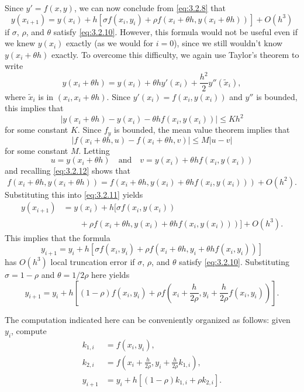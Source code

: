 Since $y'=f(x,y)$, we can now conclude from \eqref{eq:3.2.8} that
\begin{equation} \label{eq:3.2.11}
y(x_{i+1})=y(x_i)+h\left[\sigma f(x_i,y_i)+\rho f(x_i+\theta
h,y(x_i+\theta h))\right]+O(h^3)
\end{equation}
if $\sigma$, $\rho$, and $\theta$ satisfy \eqref{eq:3.2.10}. However,
this formula would not be useful even if we knew $y(x_i)$ exactly (as
we would for $i=0$), since we still wouldn't know $y(x_i+\theta h)$
exactly. To overcome this difficulty, we again use Taylor's theorem to
write
\[
y(x_i+\theta h)=y(x_i)+\theta h y'(x_i)+\frac{h^2}{2}y''(\tilde x_i),
\]
where $\tilde x_i$ is in $(x_i,x_i+\theta h)$. Since
$y'(x_i)=f(x_i,y(x_i))$ and $y''$ is bounded, this implies that
\begin{equation} \label{eq:3.2.12}
|y(x_i+\theta h)-y(x_i)-\theta h f(x_i,y(x_i))|\le Kh^2
\end{equation}
for some constant $K$. Since $f_y$ is bounded, the mean value theorem
implies that
\[
|f(x_i+\theta h,u)-f(x_i+\theta h,v)|\le M|u-v|
\]
for some constant $M$. Letting
\[
u=y(x_i+\theta h)\quad\text{and}\quad v=y(x_i)+\theta h f(x_i,y(x_i))
\]
and recalling \eqref{eq:3.2.12} shows that
\[
f(x_i+\theta h,y(x_i+\theta h))=f(x_i+\theta h,y(x_i)+\theta h
f(x_i,y(x_i)))+O(h^2).
\]
Substituting this into \eqref{eq:3.2.11}   yields
\begin{align*}
y(x_{i+1})&=y(x_i)+h[\sigma f(x_i,y(x_i))\\
&\qquad+\rho f(x_i+\theta h,y(x_i)+\theta hf(x_i,y(x_i)))]+O(h^3).
\end{align*}
This implies that the formula
\[
y_{i+1}=y_i+h\left[\sigma f(x_i,y_i)+\rho f(x_i+\theta
h,y_i+\theta hf(x_i,y_i))\right]
\]
has $O(h^3)$ local truncation error if $\sigma$, $\rho$, and $\theta$
satisfy \eqref{eq:3.2.10}. Substituting $\sigma=1-\rho$ and
$\theta=1/2\rho$ here yields
\begin{equation} \label{eq:3.2.13}
y_{i+1}=y_i+h\left[(1-\rho)f(x_i,y_i)+\rho
f\left(x_i+\frac{h}{2\rho},
y_i+\frac{h}{2\rho}f(x_i,y_i)\right)\right].
\end{equation}

The computation indicated here can be conveniently organized as
follows: given $y_i$, compute
\begin{align*}
k_{1,i}&=f(x_i,y_i),\\
k_{2,i}&=f\left(x_i+\frac{h}{2\rho},y_i+\frac{h}{2\rho}k_{1,i}\right),\\
y_{i+1}&=y_i+h[(1-\rho)k_{1,i}+\rho k_{2,i}].
\end{align*}


